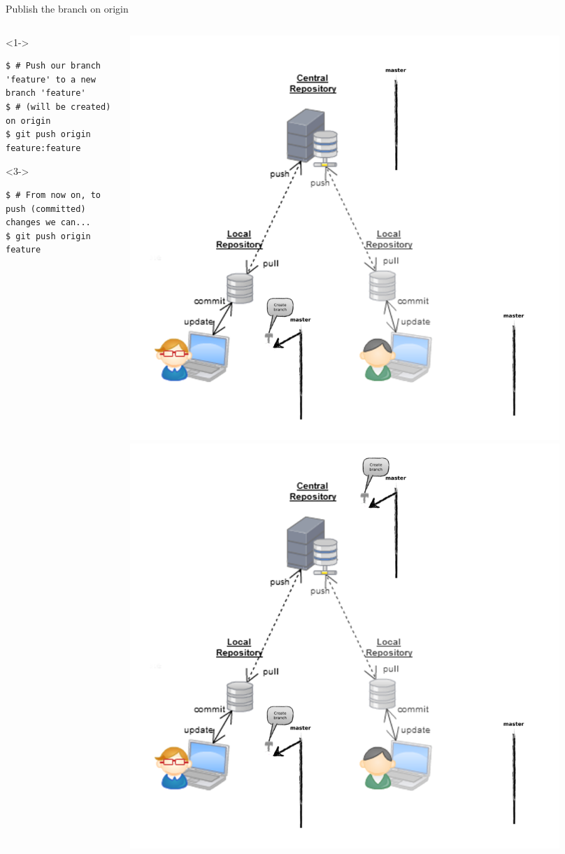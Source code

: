 \begin{frame}[fragile]{Publish the branch on origin}
\begin{columns}
	\begin{column}{0.6\textwidth}
	\begin{onlyenv}<1->
	\begin{lstlisting}
$ # Push our branch 'feature' to a new branch 'feature' 
$ # (will be created) on origin
$ git push origin feature:feature
	\end{lstlisting}
	\end{onlyenv}
	\begin{onlyenv}<3->
	\begin{lstlisting}
$ # From now on, to push (committed) changes we can...
$ git push origin feature
	\end{lstlisting}
	\end{onlyenv}
	\end{column}
	\begin{column}{0.4\textwidth}
		\begin{center}
			 {
				\includegraphics[width=0.9\textwidth]{multiuser_local_branch.png}
			}\only<2> {
				\includegraphics[width=0.9\textwidth]{multiuser_remote_branch.png}
}
\end{center}
\end{column}
\end{columns}
\end{frame}

